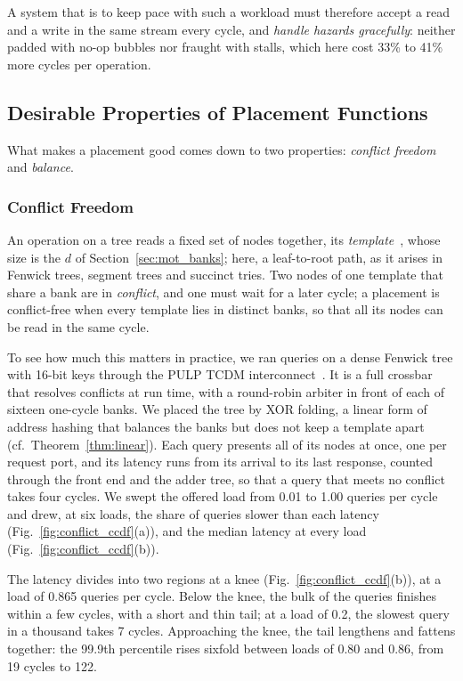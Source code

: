 A system that is to keep pace with such a workload must therefore accept a
read and a write in the same stream every cycle, and \emph{handle hazards
	gracefully}: neither padded with no-op bubbles nor fraught with stalls, which
here cost 33\% to 41\% more cycles per operation.


\subsection{Desirable Properties of Placement Functions}\label{sec:mot_conflict}

What makes a placement good comes down to two properties: \emph{conflict
	freedom} and \emph{balance}.

\subsubsection{Conflict Freedom}

An operation on a tree reads a fixed set of nodes together, its
\emph{template}~\cite{das2000mappings}, whose size is the $d$ of
Section~\ref{sec:mot_banks}; here, a leaf-to-root path, as it arises in
Fenwick trees, segment trees and succinct tries. Two nodes of one template
that share a bank are in \emph{conflict}, and one must wait for a later cycle;
a placement is conflict-free when every template lies in distinct banks, so
that all its nodes can be read in the same cycle.

To see how much this matters in practice, we ran queries on a dense Fenwick
tree with 16-bit keys through the PULP TCDM
interconnect~\cite{pulp_tcdm,pulp_cluster_interconnect}. It is a full crossbar
that resolves conflicts at run time, with a round-robin arbiter in front of
each of sixteen one-cycle banks. We placed the tree by XOR folding, a linear
form of address hashing that balances the banks but does not keep a template
apart (cf.~Theorem~\ref{thm:linear}). Each query presents all of its nodes at
once, one per request port, and its latency runs from its arrival to its last
response, counted through the front end and the adder tree, so that a query
that meets no conflict takes four cycles. We swept the offered load from 0.01
to 1.00 queries per cycle and drew, at six loads, the share of queries slower
than each latency (Fig.~\ref{fig:conflict_ccdf}(a)), and the median latency at
every load (Fig.~\ref{fig:conflict_ccdf}(b)).

The latency divides into two regions at a knee
(Fig.~\ref{fig:conflict_ccdf}(b)), at a load of 0.865 queries per cycle. Below
the knee, the bulk of the queries finishes within a few cycles, with a short
and thin tail; at a load of 0.2, the slowest query in a thousand takes
7 cycles. Approaching the knee, the tail lengthens and fattens together: the
99.9th percentile rises sixfold between loads of 0.80 and 0.86, from 19 cycles
to 122.

